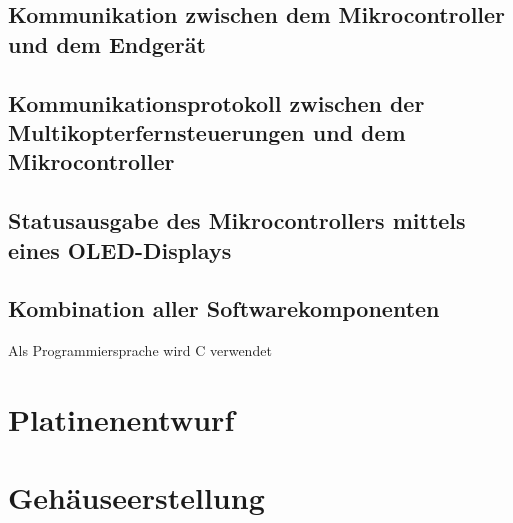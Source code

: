 \subsection{Kommunikation zwischen dem Mikrocontroller und dem Endgerät}
\subsection{Kommunikationsprotokoll zwischen der Multikopterfernsteuerungen und dem Mikrocontroller}
\subsection{Statusausgabe des Mikrocontrollers mittels eines OLED-Displays}

\subsection{Kombination aller Softwarekomponenten}
Als Programmiersprache wird C verwendet



\section{Platinenentwurf}

\section{Gehäuseerstellung}
